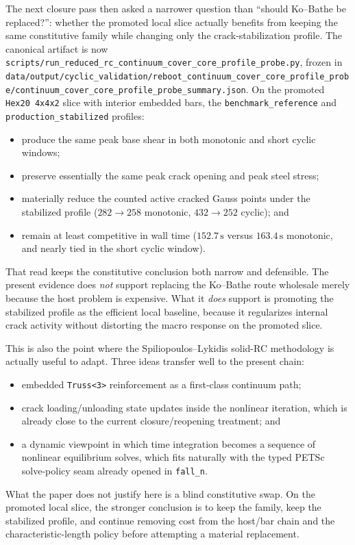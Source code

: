 The next closure pass then asked a narrower question than ``should Ko--Bathe be
replaced?'': whether the promoted local slice actually benefits from keeping
the same constitutive family while changing only the crack-stabilization
profile. The canonical artifact is now
\texttt{scripts/run\_reduced\_rc\_continuum\_cover\_core\_profile\_probe.py},
frozen in
\texttt{data/output/cyclic\_validation/reboot\_continuum\_cover\_core\_profile\_probe/continuum\_cover\_core\_profile\_probe\_summary.json}.
On the promoted \texttt{Hex20 4x4x2} slice with interior embedded bars, the
\texttt{benchmark\_reference} and \texttt{production\_stabilized} profiles:
\begin{itemize}
  \item produce the same peak base shear in both monotonic and short cyclic
    windows;
  \item preserve essentially the same peak crack opening and peak steel stress;
  \item materially reduce the counted active cracked Gauss points under the
    stabilized profile (\(282 \rightarrow 258\) monotonic,
    \(432 \rightarrow 252\) cyclic); and
  \item remain at least competitive in wall time
    (\(152.7\,\mathrm{s}\) versus \(163.4\,\mathrm{s}\) monotonic, and nearly
    tied in the short cyclic window).
\end{itemize}

That read keeps the constitutive conclusion both narrow and defensible. The
present evidence does \emph{not} support replacing the Ko--Bathe route
wholesale merely because the host problem is expensive. What it \emph{does}
support is promoting the stabilized profile as the efficient local baseline,
because it regularizes internal crack activity without distorting the macro
response on the promoted slice.

This is also the point where the Spiliopoulos--Lykidis solid-RC methodology is
actually useful to adapt. Three ideas transfer well to the present chain:
\begin{itemize}
  \item embedded \texttt{Truss<3>} reinforcement as a first-class continuum
    path;
  \item crack loading/unloading state updates inside the nonlinear iteration,
    which is already close to the current closure/reopening treatment; and
  \item a dynamic viewpoint in which time integration becomes a sequence of
    nonlinear equilibrium solves, which fits naturally with the typed PETSc
    solve-policy seam already opened in \texttt{fall\_n}.
\end{itemize}
What the paper does not justify here is a blind constitutive swap. On the
promoted local slice, the stronger conclusion is to keep the family, keep the
stabilized profile, and continue removing cost from the host/bar chain and the
characteristic-length policy before attempting a material replacement.

